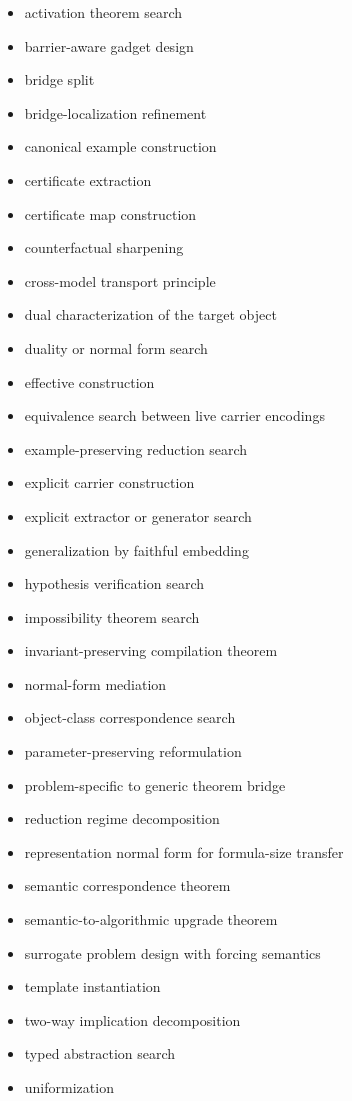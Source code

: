 \documentclass[11pt]{article}
\begin{document}
\begin{itemize}[leftmargin=*,itemsep=0.2em]
\item activation theorem search
\item barrier-aware gadget design
\item bridge split
\item bridge-localization refinement
\item canonical example construction
\item certificate extraction
\item certificate map construction
\item counterfactual sharpening
\item cross-model transport principle
\item dual characterization of the target object
\item duality or normal form search
\item effective construction
\item equivalence search between live carrier encodings
\item example-preserving reduction search
\item explicit carrier construction
\item explicit extractor or generator search
\item generalization by faithful embedding
\item hypothesis verification search
\item impossibility theorem search
\item invariant-preserving compilation theorem
\item normal-form mediation
\item object-class correspondence search
\item parameter-preserving reformulation
\item problem-specific to generic theorem bridge
\item reduction regime decomposition
\item representation normal form for formula-size transfer
\item semantic correspondence theorem
\item semantic-to-algorithmic upgrade theorem
\item surrogate problem design with forcing semantics
\item template instantiation
\item two-way implication decomposition
\item typed abstraction search
\item uniformization
\end{itemize}
\end{document}
